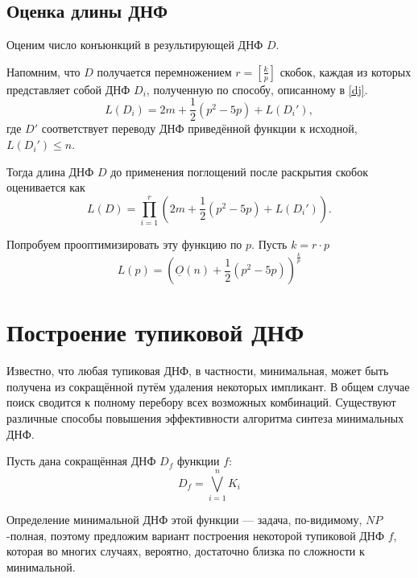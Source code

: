 \documentclass[12pt,a4paper,oneside,fleqn,leqno]{article}
\theoremstyle{definition}
\begin{document}
		\subsection{Оценка длины ДНФ}
			Оценим число конъюнкций в результирующей ДНФ $D.$\par
			Напомним, что $D$ получается перемножением $r = \left [ \frac{k}{p}\right ]$ скобок, каждая из которых представляет собой ДНФ $D_i$, полученную по способу, описанному в \ref{dj}. 
			$$L(D_i) = 2m + \frac{1}{2}(p^2 - 5p) + L(D_i'),$$
			где $D'$ соответствует переводу ДНФ приведённой функции к исходной, $L(D_i') \leqslant n$.\par
			Тогда длина ДНФ $D$ до применения поглощений после раскрытия скобок оценивается как
			$$
				L(D) = \prod_{i = 1}^{r} \left(2m + \frac{1}{2}(p^2 - 5p) + L(D_i') \right).
			$$\par
			Попробуем прооптимизировать эту функцию по $p.$ Пусть $k = r \cdot p$
			$$
				L(p) = \left( \underline{O}(n) + \frac{1}{2}(p^2 - 5p)\right)^{\frac{k}{p}}
			$$
	\section{Построение тупиковой ДНФ}
		Известно, что любая тупиковая ДНФ, в частности, минимальная, может быть получена из сокращённой путём удаления некоторых импликант. В общем случае поиск сводится к полному перебору всех возможных комбинаций. Существуют различные способы повышения эффективности алгоритма синтеза минимальных ДНФ.\par
		Пусть дана сокращённая ДНФ $D_{f}$ функции $f$:
		$$
			D_{f} = \bigvee_{i = 1}^{n} K_{i}
		$$ \par
		Определение минимальной ДНФ этой функции --- задача, по-видимому, $NP$-полная, поэтому предложим вариант построения некоторой тупиковой ДНФ $f$, которая во многих случаях, вероятно, достаточно близка по сложности к минимальной.
\end{document}
